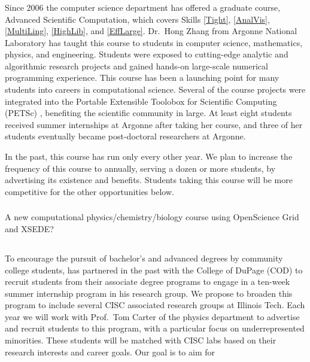 \documentclass[11pt]{NSFamsart}
\begin{document}
\subsubsection{\LargeSCName} \label{LargeSC} Since 2006 the computer science department has offered a graduate course, Advanced Scientific Computation, which covers Skills \ref{Tight}, \ref{AnalVis}, \ref{MultiLing}, \ref{HighLib}, and \ref{EffLarge}.  Dr.~Hong Zhang from Argonne National Laboratory has taught this course to students in computer science, mathematics, physics, and engineering. Students were exposed to cutting-edge analytic and algorithmic research projects and gained hands-on large-scale numerical programming experience. This course has been a launching point for many students into careers in computational science.  Several of the course projects were integrated into the Portable Extensible Toolobox for Scientific Computing (PETSc) \cite{petsc-web-page17}, benefiting the scientific community in large. At least eight students received summer internships at Argonne after taking her course, and three of her students eventually became post-doctoral researchers at Argonne.  

In the past, this course has run only every other year.  We plan to increase the frequency of this course to annually, serving a dozen or more students, by advertising its existence and benefits.  Students taking this course will be more competitive for the other opportunities below.

\subsubsection{\PhyChemBioCompSciName} \label{PhyChemBioCompSci} A new computational physics/chemistry/biology course using OpenScience Grid and XSEDE? 

\subsection{\CODSummerName} \label{CODSummer}

To  encourage the pursuit of bachelor's and advanced degrees by community college students, \JW has partnered in the past with the College of DuPage (COD) to recruit students from their associate degree programs  to engage in a ten-week summer internship program in his research group.  We propose to broaden this program to include several CISC associated research groups at Illinois Tech. Each year we will work with Prof.~Tom Carter of the physics department to advertise and recruit students to this program,  with a particular focus on underrepresented minorities.  These students will be matched with CISC labs based on their research interests and career goals.  Our goal is to aim for 
\end{document}

